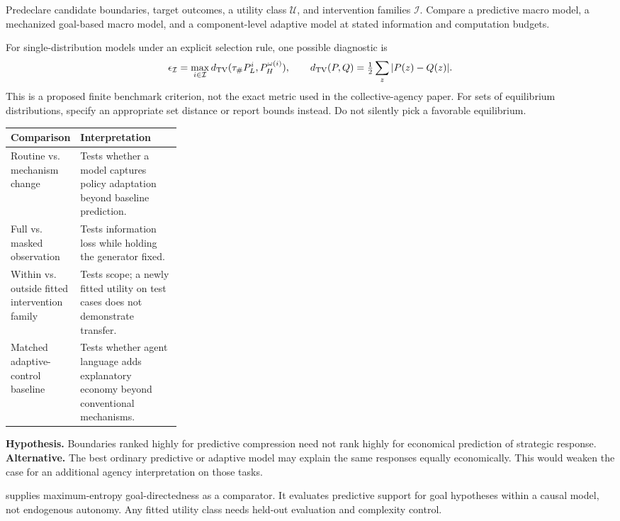 \documentclass[11pt,letterpaper]{article}
\begin{document}
 Predeclare candidate boundaries, target outcomes, a utility class $\mathcal U$, and intervention families $\mathcal I$. Compare a predictive macro model, a mechanized goal-based macro model, and a component-level adaptive model at stated information and computation budgets.

For single-distribution models under an explicit selection rule, one possible diagnostic is
\begin{equation}
 \epsilon_{\mathcal I}=\max_{i\in\mathcal I}
 d_{\rm TV}(\tau_\#P_L^i,P_H^{\omega(i)}),\qquad
 d_{\rm TV}(P,Q)=\tfrac12\sum_z|P(z)-Q(z)|.
\end{equation}
This is a proposed finite benchmark criterion, not the exact metric used in the collective-agency paper. For sets of equilibrium distributions, specify an appropriate set distance or report bounds instead. Do not silently pick a favorable equilibrium.

\begin{tabularx}{\linewidth}{L{0.28\linewidth}Y}\toprule
Comparison & Interpretation \\\midrule
Routine vs. mechanism change & Tests whether a model captures policy adaptation beyond baseline prediction. \\
Full vs. masked observation & Tests information loss while holding the generator fixed. \\
Within vs. outside fitted intervention family & Tests scope; a newly fitted utility on test cases does not demonstrate transfer. \\
Matched adaptive-control baseline & Tests whether agent language adds explanatory economy beyond conventional mechanisms. \\\bottomrule
\end{tabularx}

\textbf{Hypothesis.} Boundaries ranked highly for predictive compression need not rank highly for economical prediction of strategic response. \textbf{Alternative.} The best ordinary predictive or adaptive model may explain the same responses equally economically. This would weaken the case for an additional agency interpretation on those tasks.

\citet[PDF pp. 1--5]{macdermott2024goals} supplies maximum-entropy goal-directedness as a comparator. It evaluates predictive support for goal hypotheses within a causal model, not endogenous autonomy. Any fitted utility class needs held-out evaluation and complexity control.
\end{document}
